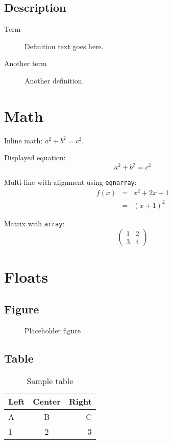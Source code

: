\documentclass[titlepage,a4paper,12pt]{article}
\begin{document}
\subsection{Description}
\begin{description}
  \item[Term] Definition text goes here.
  \item[Another term] Another definition.
\end{description}

\section{Math}
Inline math: $a^2 + b^2 = c^2$.

Displayed equation:
\begin{equation}
  \label{eq:pythagoras}
  a^2 + b^2 = c^2
\end{equation}

Multi-line with alignment using \texttt{eqnarray}:
\begin{eqnarray}
  f(x) & = & x^2 + 2x + 1 \nonumber \\
  & = & (x+1)^2
\end{eqnarray}

Matrix with \texttt{array}:
\[
  \left(
    \begin{array}{cc}
      1 & 2 \\
      3 & 4
    \end{array}
  \right)
\]

\section{Floats}
\subsection{Figure}
\begin{figure}[htbp]
  \centering
  \fbox{\rule{0pt}{2in}\rule{3in}{0pt}}
  \caption{Placeholder figure}
  \label{fig:placeholder}
\end{figure}

\subsection{Table}
\begin{table}[htbp]
  \centering
  \caption{Sample table}
  \label{tab:sample}
  \begin{tabular}{lcr}
    \hline
    Left & Center & Right \\
    \hline
    A & B & C \\
    1 & 2 & 3 \\
    \hline
  \end{tabular}
\end{table}
\end{document}
